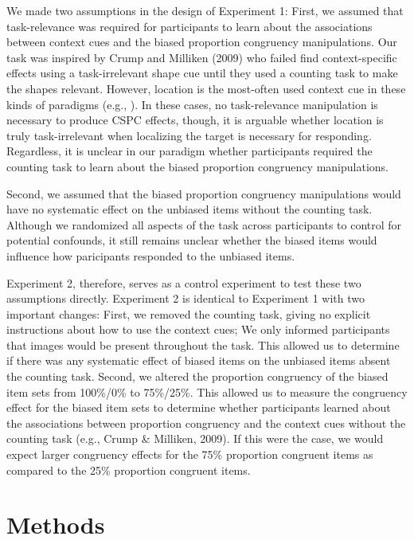 \documentclass[english,,man,floatsintext]{apa6}
\begin{document}
We made two assumptions in the design of Experiment 1: First, we assumed that task-relevance was required for participants to learn about the associations between context cues and the biased proportion congruency manipulations. Our task was inspired by Crump and Milliken (2009) who failed find context-specific effects using a task-irrelevant shape cue until they used a counting task to make the shapes relevant. However, location is the most-often used context cue in these kinds of paradigms (e.g., ). In these cases, no task-relevance manipulation is necessary to produce CSPC effects, though, it is arguable whether location is truly task-irrelevant when localizing the target is necessary for responding. Regardless, it is unclear in our paradigm whether participants required the counting task to learn about the biased proportion congruency manipulations.

Second, we assumed that the biased proportion congruency manipulations would have no systematic effect on the unbiased items without the counting task. Although we randomized all aspects of the task across participants to control for potential confounds, it still remains unclear whether the biased items would influence how paricipants responded to the unbiased items.

Experiment 2, therefore, serves as a control experiment to test these two assumptions directly. Experiment 2 is identical to Experiment 1 with two important changes: First, we removed the counting task, giving no explicit instructions about how to use the context cues; We only informed participants that images would be present throughout the task. This allowed us to determine if there was any systematic effect of biased items on the unbiased items absent the counting task. Second, we altered the proportion congruency of the biased item sets from 100\%/0\% to 75\%/25\%. This allowed us to measure the congruency effect for the biased item sets to determine whether participants learned about the associations between proportion congruency and the context cues without the counting task (e.g., Crump \& Milliken, 2009). If this were the case, we would expect larger congruency effects for the 75\% proportion congruent items as compared to the 25\% proportion congruent items.

\hypertarget{methods-1}{%
\section{Methods}\label{methods-1}}
\end{document}
